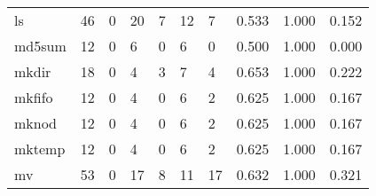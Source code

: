 \begin{longtable}{lp{2.0cm}p{2.0cm}p{2.0cm}p{2.0cm}p{2.0cm}p{2.0cm}p{2.0cm}p{2.0cm}p{2.0cm}}
ls        &                     46 &                                             0 &                                           20 &                                           7 &                                           12 &                                          7 &                                0.533 &                                  1.000 &                                0.152 \\
md5sum    &                     12 &                                             0 &                                            6 &                                           0 &                                            6 &                                          0 &                                0.500 &                                  1.000 &                                0.000 \\
mkdir     &                     18 &                                             0 &                                            4 &                                           3 &                                            7 &                                          4 &                                0.653 &                                  1.000 &                                0.222 \\
mkfifo    &                     12 &                                             0 &                                            4 &                                           0 &                                            6 &                                          2 &                                0.625 &                                  1.000 &                                0.167 \\
mknod     &                     12 &                                             0 &                                            4 &                                           0 &                                            6 &                                          2 &                                0.625 &                                  1.000 &                                0.167 \\
mktemp    &                     12 &                                             0 &                                            4 &                                           0 &                                            6 &                                          2 &                                0.625 &                                  1.000 &                                0.167 \\
mv        &                     53 &                                             0 &                                           17 &                                           8 &                                           11 &                                         17 &                                0.632 &                                  1.000 &                                0.321 \\

\end{longtable}
